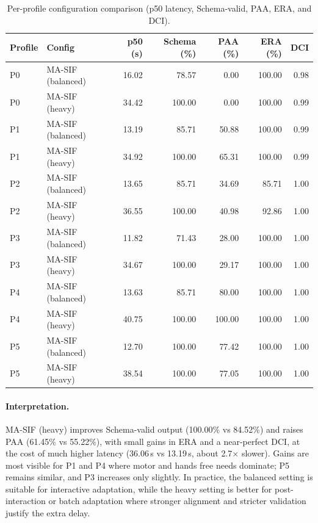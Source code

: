 \begin{table}[ht]
\centering
\caption{Per-profile configuration comparison (p50 latency, Schema-valid, PAA, ERA, and DCI).}
\label{tab:cfg-compare-profiles}
\begin{tabular}{l l r r r r r}
\toprule
\textbf{Profile} & \textbf{Config} & \textbf{p50 (s)} & \textbf{Schema (\%)} & \textbf{PAA (\%)} & \textbf{ERA (\%)} & \textbf{DCI} \\
\midrule
P0 & MA-SIF (balanced) & 16.02 & 78.57 & 0.00  & 100.00 & 0.98 \\
P0 & MA-SIF (heavy)    & 34.42 & 100.00 & 0.00  & 100.00 & 0.99 \\
P1 & MA-SIF (balanced) & 13.19 & 85.71  & 50.88 & 100.00 & 0.99 \\
P1 & MA-SIF (heavy)    & 34.92 & 100.00 & 65.31 & 100.00 & 0.99 \\
P2 & MA-SIF (balanced) & 13.65 & 85.71  & 34.69 & 85.71  & 1.00 \\
P2 & MA-SIF (heavy)    & 36.55 & 100.00 & 40.98 & 92.86  & 1.00 \\
P3 & MA-SIF (balanced) & 11.82 & 71.43  & 28.00 & 100.00 & 1.00 \\
P3 & MA-SIF (heavy)    & 34.67 & 100.00 & 29.17 & 100.00 & 1.00 \\
P4 & MA-SIF (balanced) & 13.63 & 85.71  & 80.00 & 100.00 & 1.00 \\
P4 & MA-SIF (heavy)    & 40.75 & 100.00 & 100.00& 100.00 & 1.00 \\
P5 & MA-SIF (balanced) & 12.70 & 100.00 & 77.42 & 100.00 & 1.00 \\
P5 & MA-SIF (heavy)    & 38.54 & 100.00 & 77.05 & 100.00 & 1.00 \\
\bottomrule
\end{tabular}
\end{table}

\paragraph{Interpretation.}
MA-SIF (heavy) improves Schema-valid output (100.00\% vs 84.52\%) and raises PAA (61.45\% vs 55.22\%), with small gains in ERA and a near-perfect DCI, at the cost of much higher latency (36.06\,s vs 13.19\,s, about 2.7$\times$ slower). Gains are most visible for P1 and P4 where motor and hands free needs dominate; P5 remains similar, and P3 increases only slightly. In practice, the balanced setting is suitable for interactive adaptation, while the heavy setting is better for post-interaction or batch adaptation where stronger alignment and stricter validation justify the extra delay.

